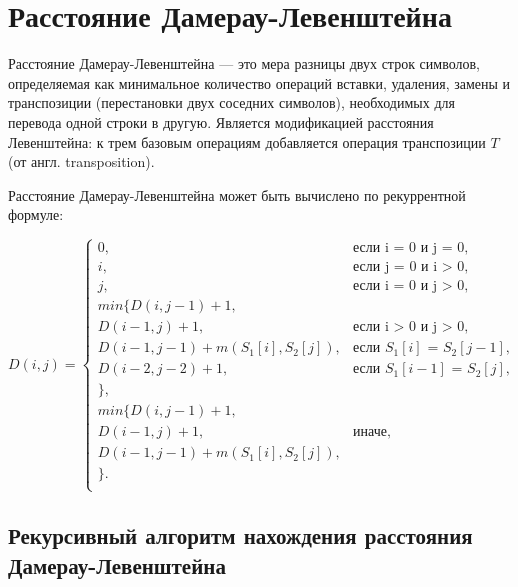 \section{Расстояние Дамерау-Левенштейна}
Расстояние Дамерау-Левенштейна --- это мера разницы двух строк символов, определяемая как минимальное количество операций вставки, удаления, замены и транспозиции (перестановки двух соседних символов), необходимых для перевода одной строки в другую. Является модификацией расстояния Левенштейна: к трем базовым операциям добавляется операция транспозиции $T$ (от англ. transposition).

Расстояние Дамерау-Левенштейна может быть вычислено по рекуррентной формуле:

\begin{equation}
	\label{eq:DL}
	D(i, j) = 
	\begin{cases}
		0, &\text{если i = 0 и j = 0,}\\
		i, &\text{если j = 0 и i > 0,}\\
		j, &\text{если i = 0 и j > 0,}\\
		min \lbrace
		D(i, j - 1) + 1,\\
		D(i - 1, j) + 1, &\text{если i > 0 и j > 0,} \\
		D(i - 1, j - 1) + m(S_{1}[i], S_{2}[j]), &\text{если $S_1[i]$ = $S_2[j - 1]$,}\\
		D(i - 2, j - 2) + 1,  &\text{если $S_1[i - 1]$ = $S_2[j]$,}\\
		\rbrace, \\
		min \lbrace
		D(i, j - 1) + 1,\\
		D(i - 1, j) + 1, &\text{иначе,}\\
		D(i - 1, j - 1) + m(S_{1}[i], S_{2}[j]), \\
		\rbrace.\\
	\end{cases}
\end{equation}

\subsection{Рекурсивный алгоритм нахождения расстояния Дамерау-Левенштейна}

